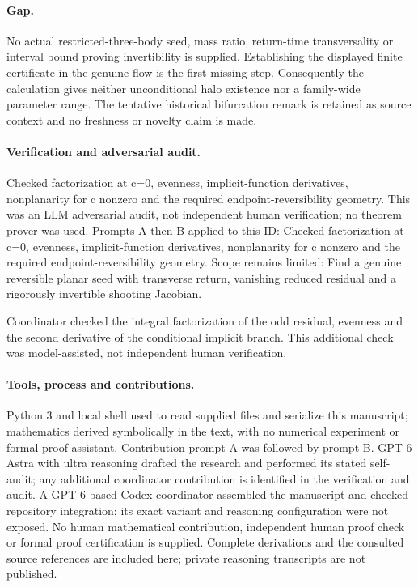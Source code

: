 \documentclass[11pt]{article}
\begin{document}
\paragraph{Gap.}No actual restricted-three-body seed, mass ratio, return-time transversality or interval bound proving invertibility is supplied. Establishing the displayed finite certificate in the genuine flow is the first missing step. Consequently the calculation gives neither unconditional halo existence nor a family-wide parameter range. The tentative historical bifurcation remark is retained as source context and no freshness or novelty claim is made.

\paragraph{Verification and adversarial audit.}
Checked factorization at c=0, evenness, implicit-function derivatives, nonplanarity for c nonzero and the required endpoint-reversibility geometry. This was an LLM adversarial audit, not independent human verification; no theorem prover was used. Prompts A then B applied to this ID: Checked factorization at c=0, evenness, implicit-function derivatives, nonplanarity for c nonzero and the required endpoint-reversibility geometry. Scope remains limited: Find a genuine reversible planar seed with transverse return, vanishing reduced residual and a rigorously invertible shooting Jacobian.

Coordinator checked the integral factorization of the odd residual, evenness and the second derivative of the conditional implicit branch. This additional check was model-assisted, not independent human verification.

\paragraph{Tools, process and contributions.}
Python 3 and local shell used to read supplied files and serialize this manuscript; mathematics derived symbolically in the text, with no numerical experiment or formal proof assistant. Contribution prompt A was followed by prompt B. GPT-6 Astra with ultra reasoning drafted the research and performed its stated self-audit; any additional coordinator contribution is identified in the verification and audit. A GPT-6-based Codex coordinator assembled the manuscript and checked repository integration; its exact variant and reasoning configuration were not exposed. No human mathematical contribution, independent human proof check or formal proof certification is supplied. Complete derivations and the consulted source references are included here; private reasoning transcripts are not published.
\end{document}
